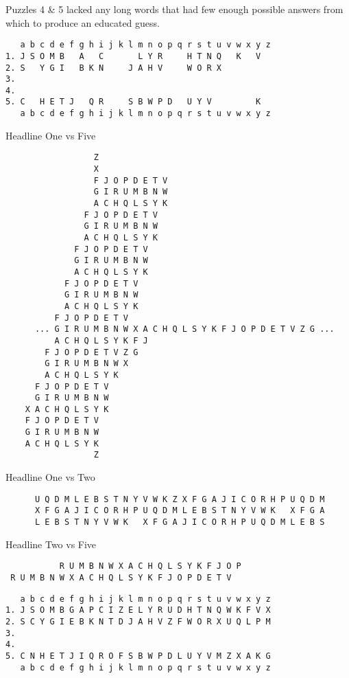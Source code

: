 \documentclass[11pt,a4paper,twoside]{article}
\begin{document}
Puzzles 4 \& 5 lacked any long words that had few enough possible answers from
which to produce an educated guess. 

\begin{lstlisting}
   a b c d e f g h i j k l m n o p q r s t u v w x y z
1. J S O M B   A   C       L Y R     H T N Q   K   V   
2. S   Y G I   B K N     J A H V     W O R X           
3.                                                     
4.                                                     
5. C   H E T J   Q R     S B W P D   U Y V         K   
   a b c d e f g h i j k l m n o p q r s t u v w x y z
\end{lstlisting}
                   
Headline One vs Five

\begin{lstlisting}
                  Z
                  X
                  F J O P D E T V 
                  G I R U M B N W  
                  A C H Q L S Y K 
                F J O P D E T V 
                G I R U M B N W  
                A C H Q L S Y K 
              F J O P D E T V 
              G I R U M B N W
              A C H Q L S Y K
            F J O P D E T V 
            G I R U M B N W 
            A C H Q L S Y K 
          F J O P D E T V  
      ... G I R U M B N W X A C H Q L S Y K F J O P D E T V Z G ...
          A C H Q L S Y K F J
        F J O P D E T V Z G    
        G I R U M B N W X 
        A C H Q L S Y K
      F J O P D E T V 
      G I R U M B N W  
    X A C H Q L S Y K
    F J O P D E T V 
    G I R U M B N W  
    A C H Q L S Y K
                  Z
\end{lstlisting}

Headline One vs Two
        
\begin{lstlisting}
      U Q D M L E B S T N Y V W K Z X F G A J I C O R H P U Q D M
      X F G A J I C O R H P U Q D M L E B S T N Y V W K   X F G A 
      L E B S T N Y V W K   X F G A J I C O R H P U Q D M L E B S       
\end{lstlisting}

Headline Two vs Five 

\begin{lstlisting}
           R U M B N W X A C H Q L S Y K F J O P 
 R U M B N W X A C H Q L S Y K F J O P D E T V 
\end{lstlisting}


\begin{lstlisting}
   a b c d e f g h i j k l m n o p q r s t u v w x y z
1. J S O M B G A P C I Z E L Y R U D H T N Q W K F V X 
2. S C Y G I E B K N T D J A H V Z F W O R X U Q L P M 
3.                                                     
4.                                                     
5. C N H E T J I Q R O F S B W P D L U Y V M Z X A K G 
   a b c d e f g h i j k l m n o p q r s t u v w x y z
\end{lstlisting}
\end{document}
